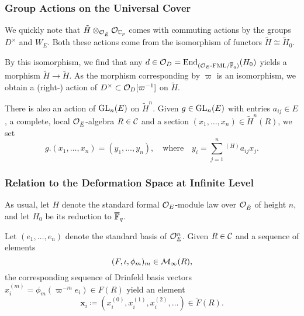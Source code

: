 \documentclass[../main.tex]{subfiles}
\begin{document}
\subsubsection{Group Actions on the Universal Cover} %
\label{ssub:Group Actions on the Universal Cover}
We quickly note that $\tilde H \otimes_{\mathcal{O}_{\breve {E}}} \mathcal{O}_{\mathbb{C}_p}$ comes with commuting actions
by the groups 
$D^\times$ and $W_E$. 
Both these actions come from the isomorphism of functors $\tilde H \cong \tilde H_0$. 

By this isomorphism, we find that any $d \in \mathcal{O}_D = \operatorname{End}_{{({\mathcal{O}_E}\text-\allowbreak\mathrm{FML}/{{\overline {\mathbb{F}}_q}})}}(H_0)$ yields a morphism $\tilde H \to \tilde H$. As the morphism
corresponding by $\varpi$ is an isomorphism, we obtain a (right-) action of 
$D^\times \subset \mathcal{O}_D[\varpi^{-1}]$ on $\tilde H$. 

There is also an action of $\operatorname{GL}_n(E)$ on $\tilde H^n$. Given 
$g \in \operatorname{GL}_n(E)$ with entries $a_{ij} \in E$, a complete, local $\mathcal{O}_{{\breve {E}}}$-algebra
$R \in \mathcal{C}$ and a section $(x_1, \dots, x_n) \in \tilde H^n(R)$, we set
\begin{equation*}
  g.(x_1, \dots, x_n) = (y_1, \dots, y_n), \quad \text{where}\quad
  y_i = \sum_{j=1}^n{}^{(H)} a_{ij}x_j.
\end{equation*}

\subsubsection{Relation to the Deformation Space at Infinite Level} %
\label{ssub:Relation to the Deformation Space at Infinite Level}
As usual, let $H$ denote the standard formal $\mathcal{O}_E$-module law over 
$\mathcal{O}_{\breve {E}}$ of height $n$, and let $H_0$ be its reduction to 
${\overline {\mathbb{F}}_q}$. 

Let $(e_1, \dots, e_n)$ denote the standard basis of $\mathcal{O}_E^n$. Given $R \in
\mathcal{C}$ and a sequence of elements
\begin{equation*}
  (F, \iota, \phi_m)_m \in \mathcal{M}_\infty(R),
\end{equation*}
the corresponding sequence of Drinfeld basis vectors $x_i^{(m)} =
\phi_m(\varpi^{-m}e_i) \in F(R)$ yield an element
\begin{equation*}
  \mathbf{x}_i \coloneqq \left(x_i^{(0)}, x_i^{(1)}, x_i^{(2)}, \dots \right)
  \in \tilde F(R). 
\end{equation*}
\end{document}
